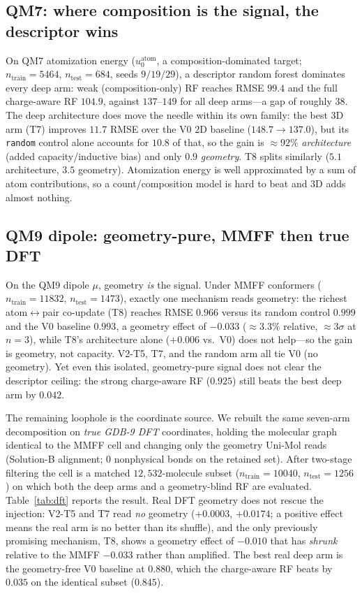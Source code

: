 \documentclass[sigconf,nonacm,anonymous,review]{acmart}
\begin{document}
\subsection{QM7: where composition is the signal, the descriptor wins}
On QM7 atomization energy ($u_0^{\text{atom}}$, a composition-dominated target; $n_{\text{train}}{=}5464$, $n_{\text{test}}{=}684$, seeds $9/19/29$), a descriptor random forest dominates every deep arm: weak (composition-only) RF reaches RMSE $99.4$ and the full charge-aware RF $104.9$, against $137$--$149$ for all deep arms---a gap of roughly $38$. The deep architecture does move the needle within its own family: the best 3D arm (T7) improves $11.7$ RMSE over the V0 2D baseline ($148.7 \to 137.0$), but its \texttt{random} control alone accounts for $10.8$ of that, so the gain is $\approx 92\%$ \emph{architecture} (added capacity/inductive bias) and only $0.9$ \emph{geometry}. T8 splits similarly ($5.1$ architecture, $3.5$ geometry). Atomization energy is well approximated by a sum of atom contributions, so a count/composition model is hard to beat and 3D adds almost nothing.

\subsection{QM9 dipole: geometry-pure, MMFF then true DFT}
On the QM9 dipole $\mu$, geometry \emph{is} the signal. Under MMFF conformers ($n_{\text{train}}{=}11832$, $n_{\text{test}}{=}1473$), exactly one mechanism reads geometry: the richest atom$\leftrightarrow$pair co-update (T8) reaches RMSE $0.966$ versus its random control $0.999$ and the V0 baseline $0.993$, a geometry effect of $-0.033$ ($\approx 3.3\%$ relative, $\approx 3\sigma$ at $n{=}3$), while T8's architecture alone ($+0.006$ vs.\ V0) does not help---so the gain is geometry, not capacity. V2-T5, T7, and the random arm all tie V0 (no geometry). Yet even this isolated, geometry-pure signal does not clear the descriptor ceiling: the strong charge-aware RF ($0.925$) still beats the best deep arm by $0.042$.

The remaining loophole is the coordinate source. We rebuilt the same seven-arm decomposition on \emph{true GDB-9 DFT} coordinates, holding the molecular graph identical to the MMFF cell and changing only the geometry Uni-Mol reads (Solution-B alignment; $0$ nonphysical bonds on the retained set). After two-stage filtering the cell is a matched $12{,}532$-molecule subset ($n_{\text{train}}{=}10040$, $n_{\text{test}}{=}1256$) on which both the deep arms and a geometry-blind RF are evaluated. Table~\ref{tab:dft} reports the result. Real DFT geometry does not rescue the injection: V2-T5 and T7 read \emph{no} geometry ($+0.0003$, $+0.0174$; a positive effect means the real arm is no better than its shuffle), and the only previously promising mechanism, T8, shows a geometry effect of $-0.010$ that has \emph{shrunk} relative to the MMFF $-0.033$ rather than amplified. The best real deep arm is the geometry-free V0 baseline at $0.880$, which the charge-aware RF beats by $0.035$ on the identical subset ($0.845$).
\end{document}
